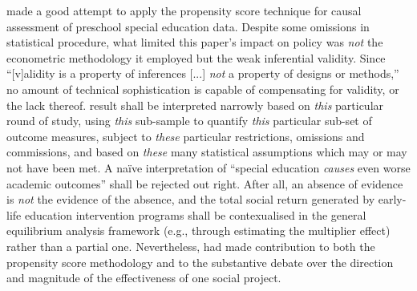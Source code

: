 \textcite{sullivan:2013} made a good attempt to apply the propensity score technique for causal assessment of preschool special education data. Despite some omissions in statistical procedure, what limited this paper's impact on policy was \emph{not} the econometric methodology it employed but the weak inferential validity. Since ``[v]alidity is a property of inferences [...] \emph{not} a property of designs or methods,'' \parencite[][p. 34, emphasis in original text]{shadish:2002} no amount of technical sophistication is capable of compensating for validity, or the lack thereof.  result shall be interpreted narrowly based on \emph{this} particular round of study, using \emph{this} sub-sample to quantify \emph{this} particular sub-set of outcome measures, subject to \emph{these} particular restrictions, omissions and commissions, and based on \emph{these} many statistical assumptions which may or may not have been met. A na{\"i}ve interpretation of ``special education \emph{causes} even worse academic outcomes'' shall be rejected out right. After all, an absence of evidence is \emph{not} the evidence of the absence, and the total social return generated by early-life education intervention programs shall be contexualised in the general equilibrium analysis framework (e.g., through estimating the multiplier effect) rather than a partial one. Nevertheless, \textcite{sullivan:2013} had made contribution to both the propensity score methodology and to the substantive debate over the direction and magnitude of the effectiveness of one social project.